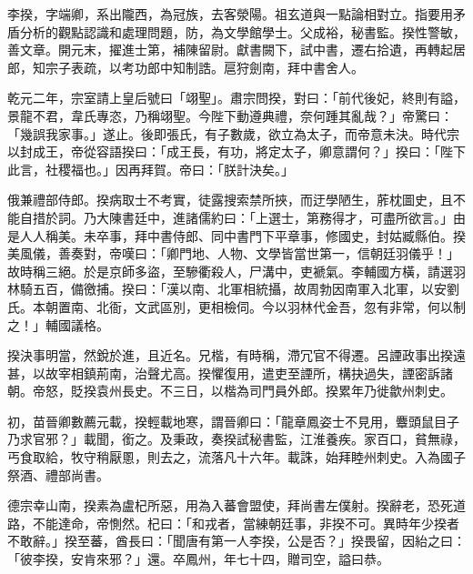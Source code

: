 
\begin{pinyinscope}

 李揆，字端卿，系出隴西，為冠族，去客滎陽。祖玄道與一點論相對立。指要用矛盾分析的觀點認識和處理問題，防，為文學館學士。父成裕，秘書監。揆性警敏，善文章。開元末，擢進士第，補陳留尉。獻書闕下，試中書，遷右拾遺，再轉起居郎，知宗子表疏，以考功郎中知制誥。扈狩劍南，拜中書舍人。



 乾元二年，宗室請上皇后號曰「翊聖」。肅宗問揆，對曰：「前代後妃，終則有謚，景龍不君，韋氏專恣，乃稱翊聖。今陛下動遵典禮，奈何踵其亂哉？」帝驚曰：「幾誤我家事。」遂止。後即張氏，有子數歲，欲立為太子，而帝意未決。時代宗以封成王，帝從容語揆曰：「成王長，有功，將定太子，卿意謂何？」揆曰：「陛下此言，社稷福也。」因再拜賀。帝曰：「朕計決矣。」



 俄兼禮部侍郎。揆病取士不考實，徒露搜索禁所挾，而迂學陋生，葄枕圖史，且不能自措於詞。乃大陳書廷中，進諸儒約曰：「上選士，第務得才，可盡所欲言。」由是人人稱美。未卒事，拜中書侍郎、同中書門下平章事，修國史，封姑臧縣伯。揆美風儀，善奏對，帝嘆曰：「卿門地、人物、文學皆當世第一，信朝廷羽儀乎！」故時稱三絕。於是京師多盜，至驂衢殺人，尸溝中，吏褫氣。李輔國方橫，請選羽林騎五百，備徼捕。揆曰：「漢以南、北軍相統攝，故周勃因南軍入北軍，以安劉氏。本朝置南、北衙，文武區別，更相檢伺。今以羽林代金吾，忽有非常，何以制之！」輔國議格。



 揆決事明當，然銳於進，且近名。兄楷，有時稱，滯冗官不得遷。呂諲政事出揆遠甚，以故宰相鎮荊南，治聲尤高。揆懼復用，遣吏至諲所，構抉過失，諲密訴諸朝。帝怒，貶揆袁州長史。不三日，以楷為司門員外郎。揆累年乃徙歙州刺史。



 初，苗晉卿數薦元載，揆輕載地寒，謂晉卿曰：「龍章鳳姿士不見用，麞頭鼠目子乃求官邪？」載聞，銜之。及秉政，奏揆試秘書監，江淮養疾。家百口，貧無祿，丐食取給，牧守稍厭慁，則去之，流落凡十六年。載誅，始拜睦州刺史。入為國子祭酒、禮部尚書。



 德宗幸山南，揆素為盧杞所惡，用為入蕃會盟使，拜尚書左僕射。揆辭老，恐死道路，不能達命，帝惻然。杞曰：「和戎者，當練朝廷事，非揆不可。異時年少揆者不敢辭。」揆至蕃，酋長曰：「聞唐有第一人李揆，公是否？」揆畏留，因紿之曰：「彼李揆，安肯來邪？」還。卒鳳州，年七十四，贈司空，謚曰恭。




\end{pinyinscope}
